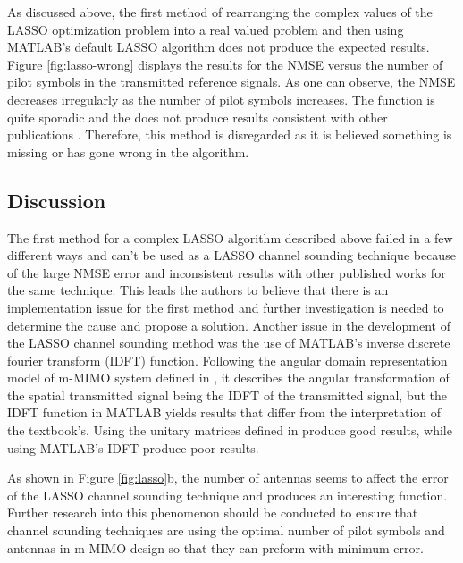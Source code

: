 As discussed above, the first method of rearranging the complex values of the LASSO optimization problem into a real valued problem and then using MATLAB's default LASSO algorithm does not produce the expected results. Figure \ref{fig:lasso-wrong} displays the results for the NMSE versus the number of pilot symbols in the transmitted reference signals. As one can observe, the NMSE decreases irregularly as the number of pilot symbols increases. The function is quite sporadic and the does not produce results consistent with other publications \cite{Liu2016}. Therefore, this method is disregarded as it is believed something is missing or has gone wrong in the algorithm.

\subsection{Discussion}

The first method for a complex LASSO algorithm described above failed in a few different ways and can't be used as a LASSO channel sounding technique because of the large NMSE error and inconsistent results with other published works for the same technique. This leads the authors to believe that there is an implementation issue for the first method and further investigation is needed to determine the cause and propose a solution. Another issue in the development of the LASSO channel sounding method was the use of MATLAB's inverse discrete fourier transform (IDFT) function. Following the angular domain representation model of m-MIMO system defined in \cite{Tse2004}, it describes the angular transformation of the spatial transmitted signal being the IDFT of the transmitted signal, but the IDFT function in MATLAB yields results that differ from the interpretation of the textbook's. Using the unitary matrices defined in \cite{Tse2004} produce good results, while using MATLAB's IDFT produce poor results.

As shown in Figure \ref{fig:lasso}b, the number of antennas seems to affect the error of the LASSO channel sounding technique and produces an interesting function. Further research into this phenomenon should be conducted to ensure that channel sounding techniques are using the optimal number of pilot symbols and antennas in m-MIMO design so that they can preform with minimum error.

